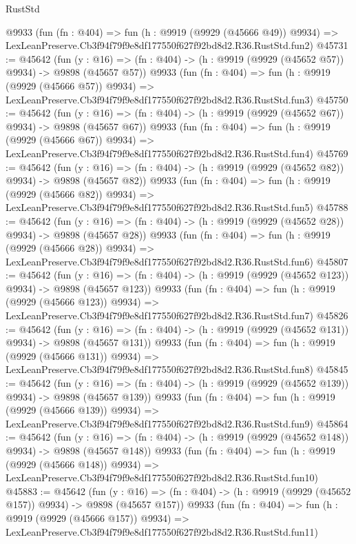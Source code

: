 \begin{lexlean}{RustStd}
\begin{coremodule}
    @9933
    (fun (fn : @404) =>
    fun (h : @9919 (@9929 (@45666 @49)) @9934) =>
    LexLeanPreserve.Cb3f94f79f9e8df177550f627f92bd8d2.R36.RustStd.fun2)
@45731 := @45642
    (fun (y : @16) => (fn : @404) -> (h : @9919 (@9929 (@45652 @57)) @9934) -> @9898 (@45657 @57))
    @9933
    (fun (fn : @404) =>
    fun (h : @9919 (@9929 (@45666 @57)) @9934) =>
    LexLeanPreserve.Cb3f94f79f9e8df177550f627f92bd8d2.R36.RustStd.fun3)
@45750 := @45642
    (fun (y : @16) => (fn : @404) -> (h : @9919 (@9929 (@45652 @67)) @9934) -> @9898 (@45657 @67))
    @9933
    (fun (fn : @404) =>
    fun (h : @9919 (@9929 (@45666 @67)) @9934) =>
    LexLeanPreserve.Cb3f94f79f9e8df177550f627f92bd8d2.R36.RustStd.fun4)
@45769 := @45642
    (fun (y : @16) => (fn : @404) -> (h : @9919 (@9929 (@45652 @82)) @9934) -> @9898 (@45657 @82))
    @9933
    (fun (fn : @404) =>
    fun (h : @9919 (@9929 (@45666 @82)) @9934) =>
    LexLeanPreserve.Cb3f94f79f9e8df177550f627f92bd8d2.R36.RustStd.fun5)
@45788 := @45642
    (fun (y : @16) => (fn : @404) -> (h : @9919 (@9929 (@45652 @28)) @9934) -> @9898 (@45657 @28))
    @9933
    (fun (fn : @404) =>
    fun (h : @9919 (@9929 (@45666 @28)) @9934) =>
    LexLeanPreserve.Cb3f94f79f9e8df177550f627f92bd8d2.R36.RustStd.fun6)
@45807 := @45642
    (fun (y : @16) => (fn : @404) -> (h : @9919 (@9929 (@45652 @123)) @9934) -> @9898 (@45657 @123))
    @9933
    (fun (fn : @404) =>
    fun (h : @9919 (@9929 (@45666 @123)) @9934) =>
    LexLeanPreserve.Cb3f94f79f9e8df177550f627f92bd8d2.R36.RustStd.fun7)
@45826 := @45642
    (fun (y : @16) => (fn : @404) -> (h : @9919 (@9929 (@45652 @131)) @9934) -> @9898 (@45657 @131))
    @9933
    (fun (fn : @404) =>
    fun (h : @9919 (@9929 (@45666 @131)) @9934) =>
    LexLeanPreserve.Cb3f94f79f9e8df177550f627f92bd8d2.R36.RustStd.fun8)
@45845 := @45642
    (fun (y : @16) => (fn : @404) -> (h : @9919 (@9929 (@45652 @139)) @9934) -> @9898 (@45657 @139))
    @9933
    (fun (fn : @404) =>
    fun (h : @9919 (@9929 (@45666 @139)) @9934) =>
    LexLeanPreserve.Cb3f94f79f9e8df177550f627f92bd8d2.R36.RustStd.fun9)
@45864 := @45642
    (fun (y : @16) => (fn : @404) -> (h : @9919 (@9929 (@45652 @148)) @9934) -> @9898 (@45657 @148))
    @9933
    (fun (fn : @404) =>
    fun (h : @9919 (@9929 (@45666 @148)) @9934) =>
    LexLeanPreserve.Cb3f94f79f9e8df177550f627f92bd8d2.R36.RustStd.fun10)
@45883 := @45642
    (fun (y : @16) => (fn : @404) -> (h : @9919 (@9929 (@45652 @157)) @9934) -> @9898 (@45657 @157))
    @9933
    (fun (fn : @404) =>
    fun (h : @9919 (@9929 (@45666 @157)) @9934) =>
    LexLeanPreserve.Cb3f94f79f9e8df177550f627f92bd8d2.R36.RustStd.fun11)

\end{coremodule}
\end{lexlean}
